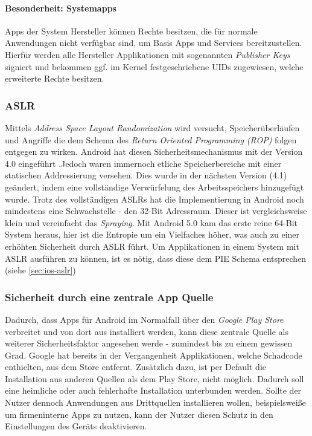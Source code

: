 	\paragraph{Besonderheit: Systemapps}
	Apps der System Hersteller können Rechte besitzen, die für normale Anwendungen nicht verfügbar sind, um Basis Apps und Services bereitzustellen. Hierfür werden alle Hersteller Applikationen mit sogenannten \textit{Publisher Keys} signiert und bekommen ggf. im Kernel festgeschriebene UIDs zugewiesen, welche erweiterte Rechte besitzen.
	
	\subsubsection{ASLR}
	Mittels \textit{Address Space Layout Randomization} wird versucht, Speicherüberläufen und Angriffe die dem Schema des \textit{Return Oriented Programming (ROP)} folgen entgegen zu wirken. Android hat diesen Sicherheitsmechanismus mit der Version 4.0 eingeführt \cite{AslrAndroid}.Jedoch waren immernoch etliche Speicherbereiche mit einer statischen Addressierung versehen. Dies wurde in der nächsten Version (4.1) geändert, indem eine vollständige Verwürfelung des Arbeitsspeichers hinzugefügt wurde\cite{BetterAslrAndroid}. Trotz des vollständigen ASLRs hat die Implementierung in Android noch mindestens eine Schwachstelle - den 32-Bit Adressraum\cite{AslrAndroid32}. Dieser ist vergleichsweise klein und vereinfacht das \textit{Spraying}. Mit Android 5.0 kam das erste reine 64-Bit System heraus, hier ist die Entropie um ein Vielfaches höher, was auch zu einer erhöhten Sicherheit durch ASLR führt. Um Applikationen in einem System mit ASLR ausführen zu können, ist es nötig, dass diese dem PIE Schema entsprechen (siehe \ref{sec:ios-aslr})
	
	
	\subsubsection{Sicherheit durch eine zentrale App Quelle}
	Dadurch, dass Apps für Android im Normalfall über den \textit{Google Play Store} verbreitet und von dort aus installiert werden, kann diese zentrale Quelle als weiterer Sicherheitsfaktor angesehen werde - zumindest bis zu einem gewissen Grad. Google hat bereits in der Vergangenheit Applikationen, welche Schadcode enthielten, aus dem Store entfernt. Zusätzlich dazu, ist per Default die Installation aus anderen Quellen als dem Play Store, nicht möglich. Dadurch soll eine heimliche oder auch fehlerhafte Installation unterbunden werden. Sollte der Nutzer dennoch Anwendungen aus Drittquellen installieren wollen, beispielsweiße um firmeninterne Apps zu nutzen, kann der Nutzer diesen Schutz in den Einstellungen des Geräts deaktivieren.